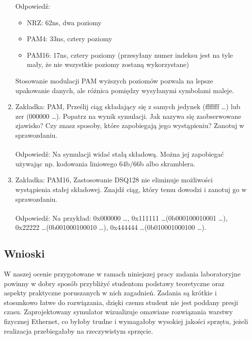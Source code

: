 \begin{enumerate}
    Odpowiedź:
    \begin{itemize}
        \item NRZ: 62ns, dwa poziomy
        \item PAM4: 33ns, cztery poziomy
        \item PAM16: 17ns, cztery poziomy (przesyłany numer indeksu jest na tyle mały, że nie wszystkie poziomy zostaną wykorzystane)
    \end{itemize} 
    Stosowanie modulacji PAM wyższych poziomów pozwala na lepsze upakowanie danych, ale różnica pomiędzy wysyłanymi symbolami maleje.
    \item Zakładka: PAM, Prześlij ciąg składający się z samych jedynek (fffffff \dots) lub zer (000000 \dots). Popatrz na wynik symulacji. Jak nazywa się zaobserwowane zjawisko? Czy znasz sposoby,
    które zapobiegają jego wystąpieniu? Zanotuj w sprawozdaniu. \\ \\
    Odpowiedź: Na symulacji widać stałą składową. Można jej zapobiegać używając np. kodowania liniowego 64b/66b albo skramblera.
    \item Zakładka: PAM16, Zastosowanie DSQ128 nie eliminuje możliwości wystąpienia stałej składowej. Znajdź ciąg, który
    temu dowodzi i zanotuj go w sprawozdaniu. \\ \\
    Odpowiedź: Na przykład: 0x000000 \dots, 0x111111 \dots (0b000100010001 \dots),\\0x22222 \dots (0b001000100010 \dots),
    0x444444 \dots (0b010001000100 \dots).
\end{enumerate}

\subsection{Wnioski}

W naszej ocenie przygotowane w ramach niniejszej pracy zadania laboratoryjne powinny w dobry sposób przybliżyć studentom podstawy
teoretyczne oraz aspekty praktyczne poruszanych w nich zagadnień. Zadania są krótkie i stosunkowo łatwe do rozwiązania, dzięki czemu
student nie jest poddany presji czasu. Zaprojektowany symulator wizualizuje omawiane rozwiązania warstwy fizycznej Ethernet, co byłoby
trudne i wymagałoby wysokiej jakości sprzętu, jeżeli realizacja przebiegałaby na rzeczywistym sprzęcie.
